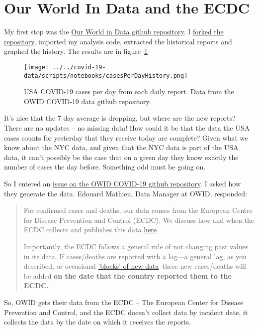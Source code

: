 \documentclass[10pt,reqno]{amsart}
\begin{document}
\section{Our World In Data and the ECDC}
My first stop was the
\href{https://github.com/owid/covid-19-data}{Our World in Data github
  repository}.  I
\href{https://github.com/hjstein/covid-19-data}{forked the
  repository}, imported my analysis code, extracted the historical
reports and graphed the history.  The results are in figure~\ref{fig:owid}

\begin{figure}[H]
  \centering
  \texttt{[image: ../../covid-19-data/scripts/notebooks/casesPerDayHistory.png]}
  \caption{USA COVID-19 cases per day from each daily report.  Data
    from the OWID COVID-19 data github repository.}
  \label{fig:owid}
\end{figure}

It's nice that the 7 day average is dropping, but where are the new
reports?  There are no updates -- no missing data!  How could it be
that the data the USA cases counts for yesterday that they receive
today are complete?  Given what we know about the NYC data, and given
that the NYC data is part of the USA data, it can't possibly be the
case that on a given day they know exactly the number of cases the day
before.  Something odd must be going on.

So I entered an
\href{https://github.com/owid/covid-19-data/issues/41}{issue on the
  OWID COVID-19 github repository}.  I asked how they generate the
data.  Edouard Mathieu, Data Manager at OWID, responded:
\begin{quotation}
  For confirmed cases and deaths, our data comes from the European
  Centre for Disease Prevention and Control (ECDC). We discuss how and
  when the ECDC collects and publishes this data \href{https://ourworldindata.org/coronavirus#our-world-in-data-relies-on-data-from-the-european-cdc}{here}.

  Importantly, the ECDC follows a general rule of not changing past
  values in its data. If cases/deaths are reported with a lag—a general
  lag, as you described, or occasional
  \href{https://www.theguardian.com/us-news/2020/apr/15/new-york-city-coronavirus-death-toll-jumps-revised-count}{'blocks'
    of new data}--these new
  cases/deaths will be added \bf{on the date that the country reported them
    to the ECDC.}
\end{quotation}

So, OWID gets their data from the ECDC -- The European Center for
Disease Prevention and Control, and the ECDC doesn't collect data by
incident date, it collects the data by the date on which it receives
the reports.
\end{document}
